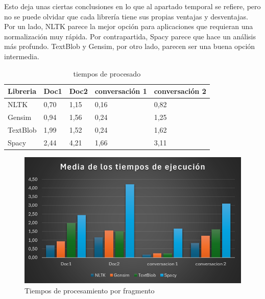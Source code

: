 \documentclass[a4paper,twocolumn]{article}
\begin{document}
    Esto deja unas ciertas conclusiones en lo que al apartado temporal se refiere,
    pero no se puede olvidar que cada librería tiene sus propias ventajas y desventajas.
    Por un lado, NLTK parece la mejor opción para aplicaciones que requieran una normalización muy rápida.
    Por contrapartida, Spacy parece que hace un análisis más profundo.
    TextBlob y Gensim, por otro lado, parecen ser una buena opción intermedia.




    \begin{table}
        \begin{adjustbox}{max width=\textwidth/2}
            \centering
            \begin{tabular}{lllll}
                \toprule
                \textbf{Libreria} & \textbf{Doc1} & \textbf{Doc2} & \textbf{conversación 1} & \textbf{conversación 2} \\
                \midrule
                NLTK              & 0,70          & 1,15          & 0,16                    & 0,82                    \\
                Gensim            & 0,94          & 1,56          & 0,24                    & 1,25                    \\
                TextBlob          & 1,99          & 1,52          & 0,24                    & 1,62                    \\
                Spacy             & 2,44          & 4,21          & 1,66                    & 3,11                    \\
                \bottomrule
            \end{tabular}
        \end{adjustbox}
        \caption{tiempos de procesado}
        \label{tab:tiempos_procesado}
    \end{table}


    \begin{figure}
        \vspace{1.5pt}
        \centering
        \includegraphics[scale=0.25]{imagenes/grafico_tiempos_procesado}
        \caption{Tiempos de procesamiento por fragmento}
        \label{fig:grafico_tiempos_procesado}
    \end{figure}
\end{document}
